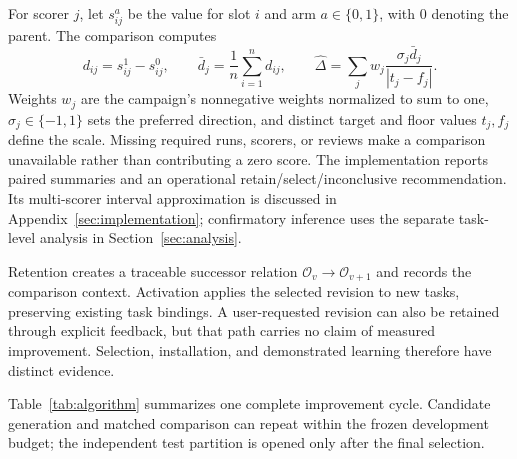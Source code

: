 For scorer $j$, let $s_{ij}^{a}$ be the value for slot $i$ and arm $a\in\{0,1\}$, with 0 denoting the parent. The comparison computes
\begin{equation}
d_{ij}=s_{ij}^{1}-s_{ij}^{0},\qquad
\bar d_j=\frac{1}{n}\sum_{i=1}^{n}d_{ij},\qquad
\widehat\Delta=\sum_j w_j\frac{\sigma_j\bar d_j}{|t_j-f_j|}.
\label{eq:comparison}
\end{equation}
Weights $w_j$ are the campaign's nonnegative weights normalized to sum to one, $\sigma_j\in\{-1,1\}$ sets the preferred direction, and distinct target and floor values $t_j,f_j$ define the scale. Missing required runs, scorers, or reviews make a comparison unavailable rather than contributing a zero score. The implementation reports paired summaries and an operational retain/select/inconclusive recommendation. Its multi-scorer interval approximation is discussed in Appendix~\ref{sec:implementation}; confirmatory inference uses the separate task-level analysis in Section~\ref{sec:analysis}.

Retention creates a traceable successor relation $\mathcal O_v\rightarrow\mathcal O_{v+1}$ and records the comparison context. Activation applies the selected revision to new tasks, preserving existing task bindings. A user-requested revision can also be retained through explicit feedback, but that path carries no claim of measured improvement. Selection, installation, and demonstrated learning therefore have distinct evidence.

Table~\ref{tab:algorithm} summarizes one complete improvement cycle. Candidate generation and matched comparison can repeat within the frozen development budget; the independent test partition is opened only after the final selection.


